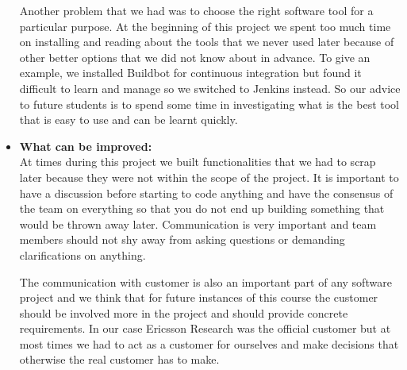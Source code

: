 \begin{itemize}
Another problem that we had was to choose the right software tool for a particular purpose. At the 
beginning of this project we spent too much time on installing and reading about the tools that we never 
used later because of other better options that we did not know about in advance. To give an example, we installed Buildbot for continuous integration but found 
it difficult to learn and manage so we switched to Jenkins instead. So our advice to future students is to 
spend some time in investigating what is the best tool that is easy to use and can be learnt quickly.       

\item{\textbf{What can be improved:}}\\
 At times during this project we built functionalities that we had to scrap later because they were not 
 within the scope of the project. It is important to have a discussion before starting to code anything 
 and have the consensus of the team on everything so that you do not end up building something that would 
 be thrown away later. Communication is very important and team members should not shy away from asking 
 questions or demanding clarifications on anything.  
 
The communication with customer is also an important part of any software project and we think that 
for future instances of this course the customer should be involved more in the project and should 
provide concrete requirements. In our case Ericsson Research was the official customer 
but at most times we had to act as a customer for ourselves and make decisions that otherwise the real 
customer has to make. 
\end{itemize}